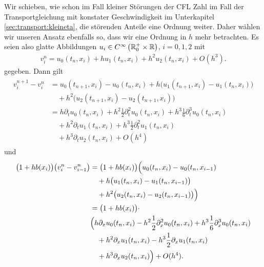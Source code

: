 Wir schieben, wie schon im Fall kleiner Störungen der CFL Zahl im Fall der Transportgleichung mit konstater Geschwindigkeit im Unterkapitel \ref{sec:transport:kleineta}, die störenden Anteile eine Ordnung weiter.
Daher wählen wir unseren Ansatz ebenfalls so, dass wir eine Ordnung in $h$ mehr betrachten.
Es seien also glatte Abbildungen $u_i \in C^{\infty}\left( \mathbb R^+_0 \times \mathbb R \right)$, $i = 0,1,2$ mit
\begin{align}
\label{eq:varadv:kleina:ansatz}
v^n_i = u_0(t_n, x_i) + h u_1(t_n, x_i) + h^2 u_2(t_n, x_i) + O(h^3).
\end{align}
gegeben.
Dann gilt
\begin{align}
\label{eq:varadv:kleina:diff1}
\begin{split}
v^{n+1}_i - v^n_i &= u_0(t_{n+1}, x_i) - u_0(t_n, x_i) + h \bigl( u_1(t_{n+1}, x_i) - u_1(t_n, x_i) \bigr)\\
&\quad + h^2 \bigl( u_2(t_{n+1}, x_i) - u_2(t_{n+1}, x_i) \bigr)\\
&=  h \partial_t u_0(t_n, x_i) + h^2 \frac{1}{2} \partial^2_t u_0(t_n, x_i) + h^3 \frac{1}{6} \partial^3_t u_0(t_n, x_i)\\
&\quad + h^2  \partial_t u_1(t_n, x_i) + h^3 \frac{1}{2} \partial^2_t u_1(t_n, x_i)\\
&\quad + h^3  \partial_t u_2(t_n, x_i) + O(h^4)
\end{split}
\end{align}
und
\begin{align}
\label{eq:varadv:kleina:diff2}
\begin{split}
\bigl( 1 + h b(x_i) \bigr)  \bigl( v^n_i - v^n_{i-1} \bigr) &= \bigl(1 + h b(x_i) \bigr) \Bigl( u_0(t_n, x_i) - u_0(t_n, x_{i-1})\\
&\quad + h \bigl( u_1(t_n, x_i) - u_1(t_n, x_{i-1}) \bigr)\\
&\quad + h^2 \bigl( u_2(t_n, x_i) - u_2(t_n, x_{i-1}) \bigr) \Bigr)\\
&= \bigl(1 + h b(x_i) \bigr) \cdot \\
&\Bigl( h \partial_x u_0(t_n, x_i) - h^2 \frac{1}{2} \partial^2_x u_0(t_n, x_i) + h^3 \frac{1}{6} \partial^3_x u_0(t_n, x_i)\\
&\quad + h^2 \partial_x u_1(t_n, x_i) - h^3 \frac{1}{2} \partial_x u_1(t_n, x_i)\\
&\quad + h^3 \partial_x u_2(t_n, x_i) \Bigr) + O(h^4).
\end{split}
\end{align}
